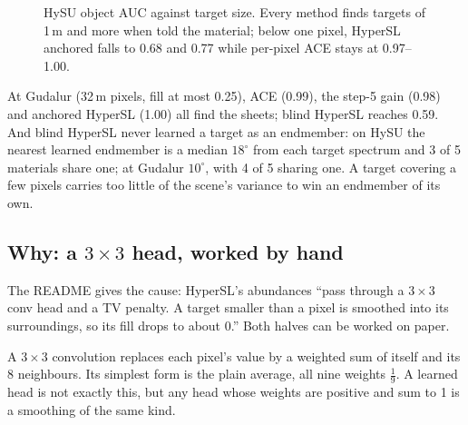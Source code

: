 \begin{figure}[htbp]
\centering
{}
\caption{HySU object AUC against target size. Every method finds targets of 1\,m and more when told the material; below
one pixel, HyperSL anchored falls to 0.68 and 0.77 while per-pixel ACE stays at 0.97--1.00.}
\label{fig:hslunmix:hysu}
\end{figure}

At Gudalur (32\,m pixels, fill at most 0.25), ACE (0.99), the step-5 gain (0.98) and anchored HyperSL (1.00) all find the
sheets; blind HyperSL reaches 0.59. And blind HyperSL never learned a target as an endmember: on HySU the nearest learned
endmember is a median $18^\circ$ from each target spectrum and 3 of 5 materials share one; at Gudalur $10^\circ$, with 4 of 5
sharing one. A target covering a few pixels carries too little of the scene's variance to win an endmember of its own.

\subsection{Why: a $3\times3$ head, worked by hand}

The README gives the cause: HyperSL's abundances ``pass through a $3\times3$ conv head and a TV penalty. A target smaller
than a pixel is smoothed into its surroundings, so its fill drops to about 0.'' Both halves can be worked on paper.

\begin{definition}
A $3\times3$ convolution replaces each pixel's value by a weighted sum of itself and its 8 neighbours. Its simplest form
is the plain average, all nine weights $\tfrac19$. A learned head is not exactly this, but any head whose weights are
positive and sum to 1 is a smoothing of the same kind\tagA.
\end{definition}

